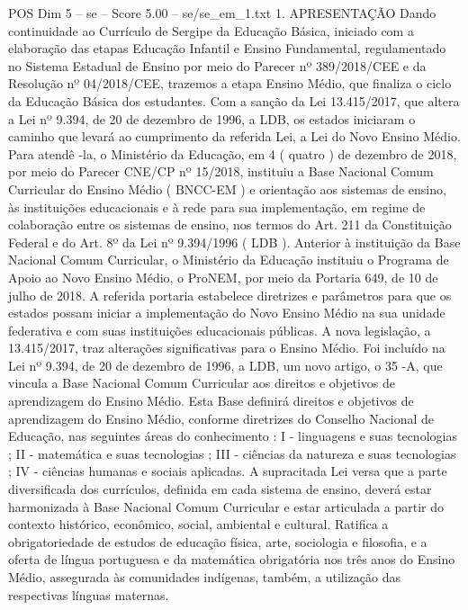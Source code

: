 \begin{textsample}{POS Dim 5 – se – Score 5.00 – se/se\_em\_1.txt}  \label{ex:f5_pos_138}
1.
APRESENTAÇÃO Dando continuidade ao Currículo de Sergipe da Educação Básica, iniciado com a elaboração das etapas Educação Infantil e Ensino Fundamental, regulamentado no Sistema Estadual de Ensino por meio do Parecer nº 389/2018/CEE e da Resolução nº 04/2018/CEE, trazemos a etapa Ensino Médio, que finaliza o ciclo da Educação Básica dos estudantes.
Com a sanção da Lei 13.415/2017, que altera a Lei nº 9.394, de 20 de dezembro de 1996, a LDB, os estados iniciaram o caminho que levará ao cumprimento da referida Lei, a Lei do Novo Ensino Médio.
Para atendê -la, o Ministério da Educação, em 4 ( quatro ) de dezembro de 2018, por meio do Parecer CNE/CP nº 15/2018, instituiu a Base Nacional Comum Curricular do Ensino Médio ( BNCC-EM ) e orientação aos sistemas de ensino, às instituições educacionais e à rede para sua implementação, em regime de colaboração entre os sistemas de ensino, nos termos do Art. 211 da Constituição Federal e do Art. 8º da Lei nº 9.394/1996 ( LDB ).
Anterior à instituição da Base Nacional Comum Curricular, o Ministério da Educação instituiu o Programa de Apoio ao Novo Ensino Médio, o ProNEM, por meio da Portaria 649, de 10 de julho de 2018.
A referida portaria estabelece diretrizes e parâmetros para que os estados possam iniciar a implementação do Novo Ensino Médio na sua unidade federativa e com suas instituições educacionais públicas.
A nova legislação, a 13.415/2017, traz alterações significativas para o Ensino Médio.
Foi incluído na Lei nº 9.394, de 20 de dezembro de 1996, a LDB, um novo artigo, o 35 -A, que vincula a Base Nacional Comum Curricular aos direitos e objetivos de aprendizagem do Ensino Médio.
Esta Base definirá direitos e objetivos de aprendizagem do Ensino Médio, conforme diretrizes do Conselho Nacional de Educação, nas seguintes áreas do conhecimento : I - linguagens e suas tecnologias ; II - matemática e suas tecnologias ; III - ciências da natureza e suas tecnologias ; IV - ciências humanas e sociais aplicadas.
A supracitada Lei versa que a parte diversificada dos currículos, definida em cada sistema de ensino, deverá estar harmonizada à Base Nacional Comum Curricular e estar articulada a partir do contexto histórico, econômico, social, ambiental e cultural.
Ratifica a obrigatoriedade de estudos de educação física, arte, sociologia e filosofia, e a oferta de língua portuguesa e da matemática obrigatória nos três anos do Ensino Médio, assegurada às comunidades indígenas, também, a utilização das respectivas línguas maternas.

\end{textsample}
